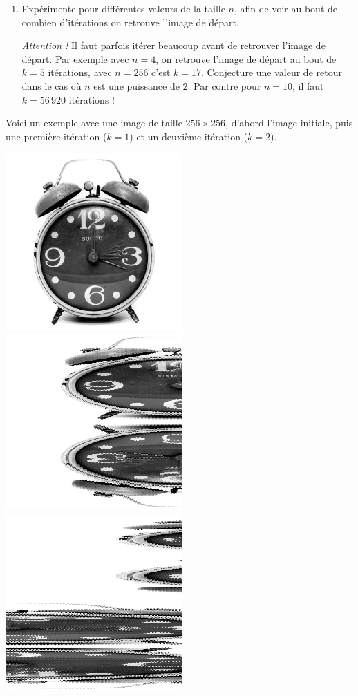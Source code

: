 \documentclass[11pt,class=report,crop=false]{standalone}
\begin{document}
\begin{activite}
\begin{enumerate}
  \item Expérimente pour différentes valeurs de la taille $n$, afin de voir au bout de combien d'itérations on retrouve l'image de départ. 
  
  \emph{Attention !} Il faut parfois itérer beaucoup avant de retrouver l'image de départ. Par exemple avec $n=4$, on retrouve l'image de départ au bout de $k=5$ itérations, avec $n=256$ c'est $k=17$. Conjecture une valeur de retour dans le cas où $n$ est une puissance de $2$. Par contre pour $n=10$, il faut $k = 56\,920$ itérations !
   
  
\end{enumerate}

Voici un exemple avec une image de taille $256 \times 256$, d'abord l'image initiale, puis une première itération ($k=1$) et un deuxième itération ($k=2$).
\begin{center}
\includegraphics[scale=0.4]{images_fiche/reveil_gimp_new_boul_0.png}\qquad
\includegraphics[scale=0.4]{images_fiche/reveil_gimp_new_boul_1.png}\qquad
\includegraphics[scale=0.4]{images_fiche/reveil_gimp_new_boul_2.png}

\end{center}
\end{activite}
\end{document}
